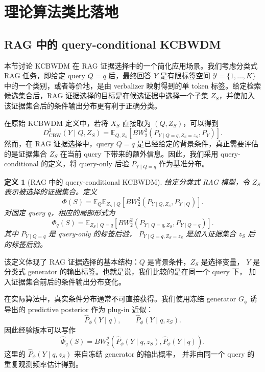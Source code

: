 \documentclass[UTF8,a4paper,12pt,oneside]{ctexart}
\newtheorem{definition}{定义}
\numberwithin{equation}{section}
\begin{document}
\section{理论算法类比落地}
\subsection{RAG 中的 query-conditional KCBWDM}

本节讨论 KCBWDM 在 RAG 证据选择中的一个简化应用场景。我们考虑分类式
RAG 任务，即给定 query \(Q=q\) 后，最终回答 \(Y\) 是有限标签空间
\(\mathcal Y=\{1,\ldots,K\}\) 中的一个类别，或者等价地，是由 verbalizer
映射得到的单 token 标签。给定检索候选集合后，RAG 证据选择的目标是在候选证据中选择一个子集
\(Z_S\)，并使加入该证据集合后的条件输出分布更有利于正确分类。

在原始 KCBWDM 定义中，若将 \(X_S\) 直接取为 \((Q,Z_S)\)，可以得到
\[
    D^2_{\mathrm{CBW}}(Y\mid Q,Z_S)
    =
    \mathbb E_{Q,Z_S}
    \left[
        BW_2^2
        \left(
            P_{Y\mid Q=q,Z_S=z_S},
            P_Y
        \right)
    \right].
\]
然而，在 RAG 证据选择中，query \(Q=q\) 是已经给定的背景条件，真正需要评估的是证据集合
\(Z_S\) 在当前 query 下带来的额外信息。因此，我们采用 query-conditional 的定义，将
query-only 后验 \(P_{Y\mid Q=q}\) 作为基准分布。

\begin{definition}[RAG 中的 query-conditional KCBWDM]
给定分类式 RAG 模型，令 \(Z_S\) 表示被选择的证据集合。定义
\[
    \Phi(S)
    =
    \mathbb E_Q
    \mathbb E_{Z_S\mid Q}
    \left[
        BW_2^2
        \left(
            P_{Y\mid Q,Z_S},
            P_{Y\mid Q}
        \right)
    \right].
\]
对固定 query \(q\)，相应的局部形式为
\[
    \Phi_q(S)
    =
    \mathbb E_{Z_S\mid Q=q}
    \left[
        BW_2^2
        \left(
            P_{Y\mid Q=q,Z_S},
            P_{Y\mid Q=q}
        \right)
    \right].
\]
其中 \(P_{Y\mid Q=q}\) 是 query-only 的标签后验，
\(P_{Y\mid Q=q,Z_S=z_S}\) 是加入证据集合 \(z_S\) 后的标签后验。
\end{definition}

该定义体现了 RAG 证据选择的基本结构：\(Q\) 是背景条件，\(Z_S\) 是选择变量，
\(Y\) 是分类式 generator 的输出标签。也就是说，我们比较的是在同一个 query 下，
加入证据集合前后的条件输出分布变化。

在实际算法中，真实条件分布通常不可直接获得。我们使用冻结 generator \(G_\phi\)
诱导出的 predictive posterior 作为 plug-in 近似：
\[
    \widehat P_\phi(Y\mid q),
    \qquad
    \widehat P_\phi(Y\mid q,z_S).
\]
因此经验版本可以写作
\[
    \widehat \Phi_q(S)
    =
    BW_2^2
    \left(
        \widehat P_\phi(Y\mid q,z_S),
        \widehat P_\phi(Y\mid q)
    \right).
\]
这里的 \(\widehat P_\phi(Y\mid q,z_S)\) 来自冻结 generator 的输出概率，
并非由同一个 query 的重复观测频率估计得到。
\end{document}
